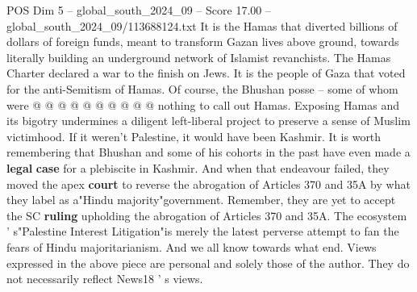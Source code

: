 \begin{textsample}{POS Dim 5 – global\_south\_2024\_09 – Score 17.00 – global\_south\_2024\_09/113688124.txt}
It is the Hamas that diverted billions of dollars of foreign funds, meant to transform Gazan lives above ground, towards literally building an underground network of Islamist revanchists.
The Hamas Charter declared a war to the finish on Jews.
It is the people of Gaza that voted for the anti-Semitism of Hamas.
Of course, the Bhushan posse -- some of whom were @ @ @ @ @ @ @ @ @ @ nothing to call out Hamas.
Exposing Hamas and its bigotry undermines a diligent left-liberal project to preserve a sense of Muslim victimhood.
If it weren't Palestine, it would have been Kashmir.
It is worth remembering that Bhushan and some of his cohorts in the past have even made a \textbf{legal} \textbf{case} for a plebiscite in Kashmir.
And when that endeavour failed, they moved the apex \textbf{court} to reverse the abrogation of Articles 370 and 35A by what they label as a"Hindu majority"government.
Remember, they are yet to accept the SC \textbf{ruling} upholding the abrogation of Articles 370 and 35A.
The ecosystem ' s"Palestine Interest Litigation"is merely the latest perverse attempt to fan the fears of Hindu majoritarianism.
And we all know towards what end.
Views expressed in the above piece are personal and solely those of the author.
They do not necessarily reflect News18 ' s views.

\end{textsample}
